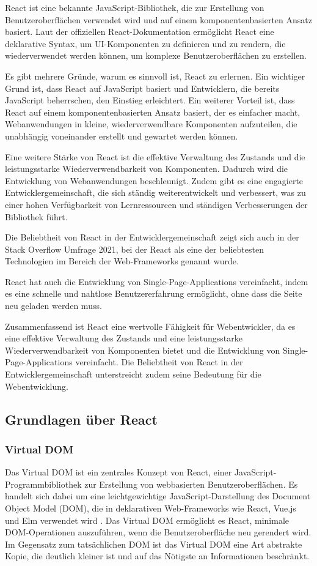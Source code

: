 React ist eine bekannte JavaScript-Bibliothek, die zur Erstellung von Benutzeroberflächen verwendet wird und auf einem komponentenbasierten Ansatz basiert. Laut der offiziellen React-Dokumentation ermöglicht React eine deklarative Syntax, um UI-Komponenten zu definieren und zu rendern, die wiederverwendet werden können, um komplexe Benutzeroberflächen zu erstellen.\cite{ReactJS} 

Es gibt mehrere Gründe, warum es sinnvoll ist, React zu erlernen. Ein wichtiger Grund ist, dass React auf JavaScript basiert und Entwicklern, die bereits JavaScript beherrschen, den Einstieg erleichtert. Ein weiterer Vorteil ist, dass React auf einem komponentenbasierten Ansatz basiert, der es einfacher macht, Webanwendungen in kleine, wiederverwendbare Komponenten aufzuteilen, die unabhängig voneinander erstellt und gewartet werden können.\cite{Kinsta} 

Eine weitere Stärke von React ist die effektive Verwaltung des Zustands und die leistungsstarke Wiederverwendbarkeit von Komponenten. Dadurch wird die Entwicklung von Webanwendungen beschleunigt. Zudem gibt es eine engagierte Entwicklergemeinschaft, die sich ständig weiterentwickelt und verbessert, was zu einer hohen Verfügbarkeit von Lernressourcen und ständigen Verbesserungen der Bibliothek führt.\cite{Kinsta}

Die Beliebtheit von React in der Entwicklergemeinschaft zeigt sich auch in der Stack Overflow Umfrage 2021, bei der React als eine der beliebtesten Technologien im Bereich der Web-Frameworks genannt wurde.\cite{StackOverflowSurvey}

React hat auch die Entwicklung von Single-Page-Applications vereinfacht, indem es eine schnelle und nahtlose Benutzererfahrung ermöglicht, ohne dass die Seite neu geladen werden muss.\cite{Kinsta}

Zusammenfassend ist React eine wertvolle Fähigkeit für Webentwickler, da es eine effektive Verwaltung des Zustands und eine leistungsstarke Wiederverwendbarkeit von Komponenten bietet und die Entwicklung von Single-Page-Applications vereinfacht. Die Beliebtheit von React in der Entwicklergemeinschaft unterstreicht zudem seine Bedeutung für die Webentwicklung.

\subsection{Grundlagen über React}
\subsubsection{Virtual DOM}
Das Virtual DOM ist ein zentrales Konzept von React, einer JavaScript-Programmbibliothek zur Erstellung von webbasierten Benutzeroberflächen\cite{ReactWikipedia}. Es handelt sich dabei um eine leichtgewichtige JavaScript-Darstellung des Document Object Model (DOM), die in deklarativen Web-Frameworks wie React, Vue.js und Elm verwendet wird \cite{VueJsAdesso}. Das Virtual DOM ermöglicht es React, minimale DOM-Operationen auszuführen, wenn die Benutzeroberfläche neu gerendert wird. Im Gegensatz zum tatsächlichen DOM ist das Virtual DOM eine Art abstrakte Kopie, die deutlich kleiner ist und auf das Nötigste an Informationen beschränkt.\cite{ReactWikipedia}

